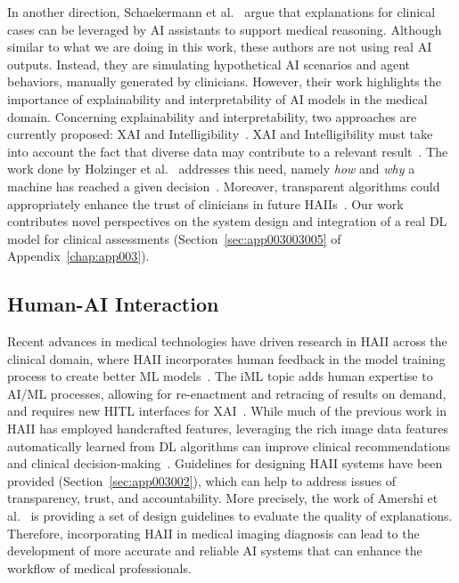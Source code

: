 In another direction, Schaekermann et al.~\cite{10.1145/3313831.3376506} argue that explanations for clinical cases can be leveraged by \ac{AI} assistants to support medical reasoning.
Although similar to what we are doing in this work, these authors are not using real \ac{AI} outputs.
Instead, they are simulating hypothetical \ac{AI} scenarios and agent behaviors, manually generated by clinicians.
However, their work highlights the importance of explainability and interpretability of \ac{AI} models in the medical domain.
Concerning explainability and interpretability, two approaches are currently proposed: \ac{XAI} and Intelligibility~\cite{gunning2017explainable}.
\ac{XAI} and Intelligibility must take into account the fact that diverse data may contribute to a relevant result~\cite{10.1145/3411764.3445736, Bharadhwaj:2019:ERS:3308557.3308699}.
The work done by Holzinger et al.~\cite{holzinger2018current} addresses this need, namely {\it how} and {\it why} a machine has reached a given decision~\cite{shah2019artificial}.
Moreover, transparent algorithms could appropriately enhance the trust of clinicians in future \acp{HAII}~\cite{Dominguez:2019:EEA:3301275.3302274, Weisz:2019:BTS:3301275.3302290}.
Our work contributes novel perspectives on the system design and integration of a real \ac{DL} model for clinical assessments (Section~\ref{sec:app003003005} of Appendix~\ref{chap:app003}).

\subsection{Human-AI Interaction}
\label{sec:chap005002002}

Recent advances in medical technologies have driven research in \ac{HAII} across the clinical domain, where \ac{HAII} incorporates human feedback in the model training process to create better \ac{ML} models~\cite{10.1145/3411764.3445717, 10.1145/3411764.3445562}.
The \ac{iML} topic adds human expertise to \ac{AI}/\ac{ML} processes, allowing for re-enactment and retracing of results on demand, and requires new \ac{HITL} interfaces for \ac{XAI}~\cite{CALISTO2021102607}.
While much of the previous work in \ac{HAII} has employed handcrafted features, leveraging the rich image data features automatically learned from \ac{DL} algorithms can improve clinical recommendations and clinical decision-making~\cite{holzinger2019interactive}.
Guidelines for designing \ac{HAII} systems have been provided (Section~\ref{sec:app003002}), which can help to address issues of transparency, trust, and accountability.
More precisely, the work of Amershi et al.~\cite{10.1145/3290605.3300233} is providing a set of design guidelines to evaluate the quality of explanations.
Therefore, incorporating \ac{HAII} in medical imaging diagnosis can lead to the development of more accurate and reliable \ac{AI} systems that can enhance the workflow of medical professionals.

